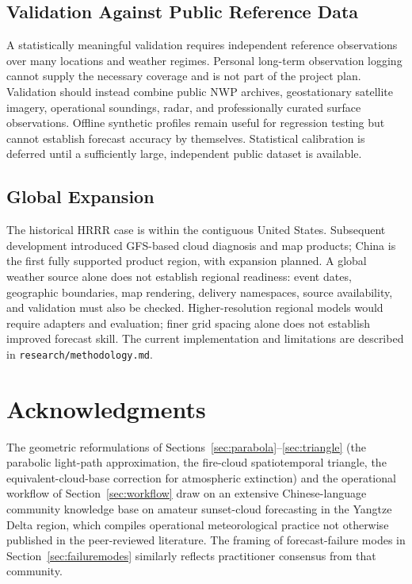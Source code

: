 \documentclass[11pt,a4paper]{article}
\begin{document}
\subsection{Validation Against Public Reference Data}
\label{sec:validation}

A statistically meaningful validation requires independent reference observations over many locations and weather regimes. Personal long-term observation logging cannot supply the necessary coverage and is not part of the project plan. Validation should instead combine public NWP archives, geostationary satellite imagery, operational soundings, radar, and professionally curated surface observations. Offline synthetic profiles remain useful for regression testing but cannot establish forecast accuracy by themselves. Statistical calibration is deferred until a sufficiently large, independent public dataset is available.

\subsection{Global Expansion}
\label{sec:globalext}
\label{sec:future}

The historical HRRR case is within the contiguous United States. Subsequent development introduced GFS-based cloud diagnosis and map products; China is the first fully supported product region, with expansion planned. A global weather source alone does not establish regional readiness: event dates, geographic boundaries, map rendering, delivery namespaces, source availability, and validation must also be checked. Higher-resolution regional models would require adapters and evaluation; finer grid spacing alone does not establish improved forecast skill. The current implementation and limitations are described in \texttt{research/methodology.md}.

\section*{Acknowledgments}

The geometric reformulations of Sections~\ref{sec:parabola}--\ref{sec:triangle} (the parabolic light-path approximation, the fire-cloud spatiotemporal triangle, the equivalent-cloud-base correction for atmospheric extinction) and the operational workflow of Section~\ref{sec:workflow} draw on an extensive Chinese-language community knowledge base on amateur sunset-cloud forecasting in the Yangtze Delta region, which compiles operational meteorological practice not otherwise published in the peer-reviewed literature. The framing of forecast-failure modes in Section~\ref{sec:failuremodes} similarly reflects practitioner consensus from that community.
\end{document}
